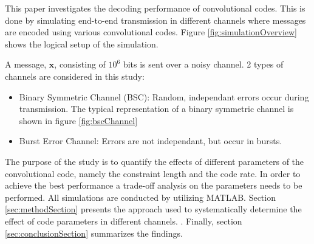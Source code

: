 This paper investigates the decoding performance of convolutional codes. This is done by simulating end-to-end transmission in different channels where messages are encoded using various convolutional codes.
Figure \ref{fig:simulationOverview} shows the logical setup of the simulation.



A message, $\textbf{x}$, consisting of $10^6$ bits is sent over a noisy channel. 2 types of channels are considered in this study:
\begin{itemize}\setlength\itemsep{0pt}
   \item Binary Symmetric Channel (BSC): Random, independant errors occur during transmission. The typical representation of a binary symmetric channel is shown in figure \ref{fig:bscChannel}
   \item Burst Error Channel: Errors are not independant, but occur in bursts.
\end{itemize}



The purpose of the study is to quantify the effects of different parameters of the convolutional code, namely the constraint length and the code rate. In order to achieve the best performance a trade-off analysis on the parameters needs to be performed. 
All simulations are conducted by utilizing MATLAB. Section \ref{sec:methodSection} presents the approach used to systematically determine the effect of code parameters in different channels. . Finally, section \ref{sec:conclusionSection} summarizes the findings.

